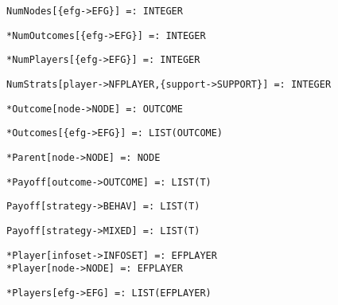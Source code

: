 \protect \large \begin{verbatim}
NumNodes[{efg->EFG}] =: INTEGER
\end{verbatim}\normalsize

\protect \large \begin{verbatim}
*NumOutcomes[{efg->EFG}] =: INTEGER
\end{verbatim} \normalsize

\protect \large \begin{verbatim}
*NumPlayers[{efg->EFG}] =: INTEGER
\end{verbatim} \normalsize

\protect \large \begin{verbatim}
NumStrats[player->NFPLAYER,{support->SUPPORT}] =: INTEGER
\end{verbatim}\normalsize

\protect \large \begin{verbatim}
*Outcome[node->NODE] =: OUTCOME
\end{verbatim}\normalsize

\protect \large \begin{verbatim}
*Outcomes[{efg->EFG}] =: LIST(OUTCOME)
\end{verbatim}\normalsize

\protect \large \begin{verbatim}
*Parent[node->NODE] =: NODE
\end{verbatim}\normalsize

\protect \large \begin{verbatim}
*Payoff[outcome->OUTCOME] =: LIST(T)
\end{verbatim}\normalsize

\protect \large \begin{verbatim}
Payoff[strategy->BEHAV] =: LIST(T)
\end{verbatim}\normalsize

\protect \large \begin{verbatim}
Payoff[strategy->MIXED] =: LIST(T)
\end{verbatim}\normalsize

\protect \large \begin{verbatim}
*Player[infoset->INFOSET] =: EFPLAYER
*Player[node->NODE] =: EFPLAYER
\end{verbatim}\normalsize

\protect \large \begin{verbatim}
*Players[efg->EFG] =: LIST(EFPLAYER)
\end{verbatim} \normalsize

